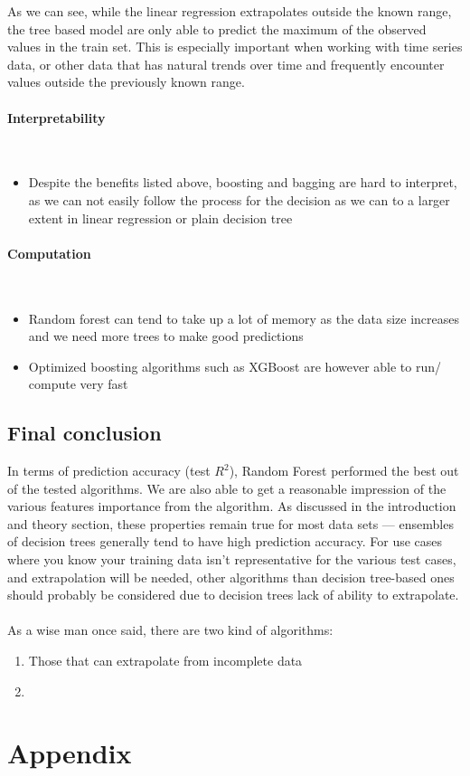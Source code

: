 \documentclass[10pt, a4paper, twocolumn]{article}
\newcommand{\myparagraph}[1]{\paragraph{#1}\mbox{}\\}
\begin{document}
	As we can see, while the linear regression extrapolates outside the known range, the tree based model are only able to predict the maximum of the observed values in the train set. This is especially important when working with time series data, or other data that has natural trends over time and frequently encounter values outside the previously known range.
	\myparagraph{Interpretability}
	\begin{itemize}
		\item Despite the benefits listed above, boosting and bagging are hard to interpret, as we can not easily follow the process for the decision as we can to a larger extent in linear regression or plain decision tree
	\end{itemize}
	\myparagraph{Computation}
	\begin{itemize}
		\item Random forest can tend to take up a lot of memory as the data size increases and we need more trees to make good predictions
		\item Optimized boosting algorithms such as XGBoost are however able to run/ compute very fast
	\end{itemize}
	\subsection{Final conclusion}
		In terms of prediction accuracy (test $R^2$), Random Forest performed the best out of the tested algorithms. We are also able to get a reasonable impression of the various features importance from the algorithm. As discussed in the introduction and theory section, these properties remain true for most data sets --- ensembles of decision trees generally tend to have high prediction accuracy. For use cases where you know your training data isn't representative for the various test cases, and extrapolation will be needed, other algorithms than decision tree-based ones should probably be considered due to decision trees lack of ability to extrapolate.\\\\
		As a wise man once said, there are two kind of algorithms:\begin{enumerate}
			\item Those that can extrapolate from incomplete data
			\item  
		\end{enumerate}


	
\onecolumn
\section{Appendix}
	
\twocolumn
	
\nocite{*}


\end{document}
